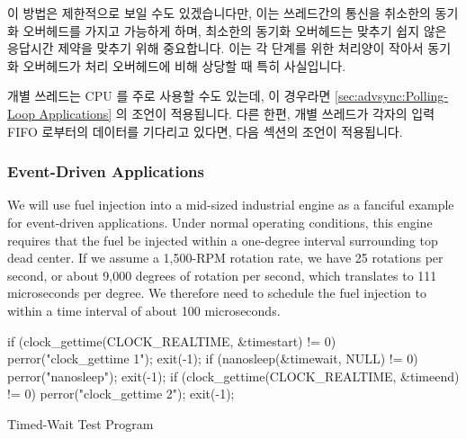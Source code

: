 \fi

이 방법은 제한적으로 보일 수도 있겠습니다만, 이는 쓰레드간의 통신을 취소한의
동기화 오버헤드를 가지고 가능하게 하며, 최소한의 동기화 오버헤드는 맞추기 쉽지
않은 응답시간 제약을 맞추기 위해 중요합니다.
이는 각 단계를 위한 처리양이 작아서 동기화 오버헤드가 처리 오버헤드에 비해
상당할 때 특히 사실입니다.

개별 쓰레드는 CPU 를 주로 사용할 수도 있는데, 이 경우라면
\cref{sec:advsync:Polling-Loop Applications} 의 조언이 적용됩니다.
다른 한편, 개별 쓰레드가 각자의 입력 FIFO 로부터의 데이터를 기다리고 있다면,
다음 섹션의 조언이 적용됩니다.

\subsubsection{Event-Driven Applications}
\label{sec:advsync:Event-Driven Applications}

We will use fuel injection into a mid-sized industrial engine as a
fanciful example for event-driven applications.
Under normal operating conditions, this engine requires that the fuel
be injected within a one-degree interval surrounding top dead center.
If we assume a 1,500-RPM rotation rate, we have 25 rotations per second,
or about 9,000 degrees of rotation per second, which translates to
111 microseconds per degree.
We therefore need to schedule the fuel injection to within a time
interval of about 100 microseconds.

\begin{listing}[tb]
\begin{fcvlabel}
\begin{VerbatimL}
if (clock_gettime(CLOCK_REALTIME, &timestart) != 0) {
	perror("clock_gettime 1");
	exit(-1);
}
if (nanosleep(&timewait, NULL) != 0) {
	perror("nanosleep");
	exit(-1);
}
if (clock_gettime(CLOCK_REALTIME, &timeend) != 0) {
	perror("clock_gettime 2");
	exit(-1);
}
\end{VerbatimL}
\end{fcvlabel}
\caption{Timed-Wait Test Program}
\label{lst:advsync:Timed-Wait Test Program}
\end{listing}

